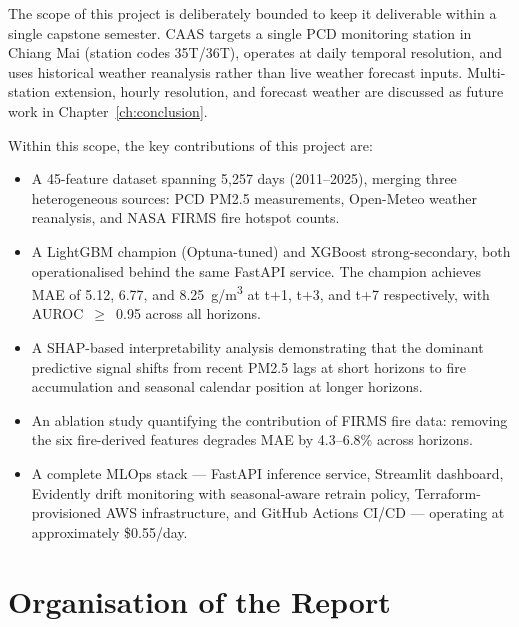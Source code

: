 The scope of this project is deliberately bounded to keep it deliverable
within a single capstone semester. CAAS targets a single PCD monitoring
station in Chiang Mai (station codes 35T/36T), operates at daily temporal
resolution, and uses historical weather reanalysis rather than live weather
forecast inputs. Multi-station extension, hourly resolution, and forecast
weather are discussed as future work in Chapter~\ref{ch:conclusion}.

Within this scope, the key contributions of this project are:

\begin{itemize}
    \item A 45-feature dataset spanning 5,257 days (2011--2025), merging
          three heterogeneous sources: PCD PM2.5 measurements, Open-Meteo
          weather reanalysis, and NASA FIRMS fire hotspot counts.

    \item A LightGBM champion (Optuna-tuned) and XGBoost strong-secondary,
          both operationalised behind the same FastAPI service. The champion
          achieves MAE of 5.12, 6.77, and 8.25~\textmu g/m\textsuperscript{3}
          at t+1, t+3, and t+7 respectively, with
          AUROC~$\geq$~0.95 across all horizons.

    \item A SHAP-based interpretability analysis demonstrating that the
          dominant predictive signal shifts from recent PM2.5 lags at
          short horizons to fire accumulation and seasonal calendar
          position at longer horizons.

    \item An ablation study quantifying the contribution of FIRMS fire
          data: removing the six fire-derived features degrades MAE by
          4.3--6.8\% across horizons.

    \item A complete MLOps stack --- FastAPI inference service, Streamlit
          dashboard, Evidently drift monitoring with seasonal-aware
          retrain policy, Terraform-provisioned AWS infrastructure,
          and GitHub Actions CI/CD --- operating at approximately
          \$0.55/day.
\end{itemize}

\section{Organisation of the Report}

